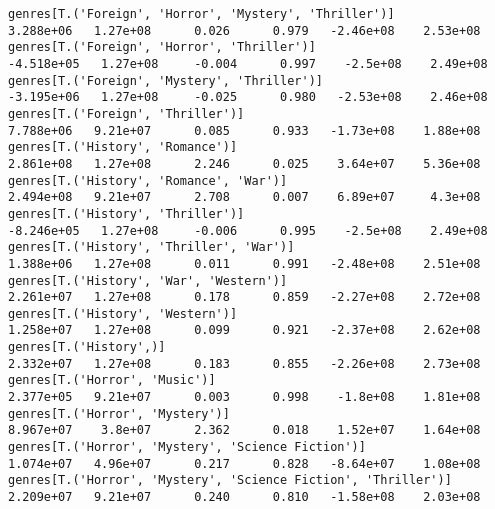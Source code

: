 \documentclass[11pt]{article}
\begin{document}
\begin{Verbatim}[commandchars=\\\{\}]
genres[T.('Foreign', 'Horror', 'Mystery', 'Thriller')]                                                        3.288e+06   1.27e+08      0.026      0.979   -2.46e+08    2.53e+08
genres[T.('Foreign', 'Horror', 'Thriller')]                                                                  -4.518e+05   1.27e+08     -0.004      0.997    -2.5e+08    2.49e+08
genres[T.('Foreign', 'Mystery', 'Thriller')]                                                                 -3.195e+06   1.27e+08     -0.025      0.980   -2.53e+08    2.46e+08
genres[T.('Foreign', 'Thriller')]                                                                             7.788e+06   9.21e+07      0.085      0.933   -1.73e+08    1.88e+08
genres[T.('History', 'Romance')]                                                                              2.861e+08   1.27e+08      2.246      0.025    3.64e+07    5.36e+08
genres[T.('History', 'Romance', 'War')]                                                                       2.494e+08   9.21e+07      2.708      0.007    6.89e+07     4.3e+08
genres[T.('History', 'Thriller')]                                                                            -8.246e+05   1.27e+08     -0.006      0.995    -2.5e+08    2.49e+08
genres[T.('History', 'Thriller', 'War')]                                                                      1.388e+06   1.27e+08      0.011      0.991   -2.48e+08    2.51e+08
genres[T.('History', 'War', 'Western')]                                                                       2.261e+07   1.27e+08      0.178      0.859   -2.27e+08    2.72e+08
genres[T.('History', 'Western')]                                                                              1.258e+07   1.27e+08      0.099      0.921   -2.37e+08    2.62e+08
genres[T.('History',)]                                                                                        2.332e+07   1.27e+08      0.183      0.855   -2.26e+08    2.73e+08
genres[T.('Horror', 'Music')]                                                                                 2.377e+05   9.21e+07      0.003      0.998    -1.8e+08    1.81e+08
genres[T.('Horror', 'Mystery')]                                                                               8.967e+07    3.8e+07      2.362      0.018    1.52e+07    1.64e+08
genres[T.('Horror', 'Mystery', 'Science Fiction')]                                                            1.074e+07   4.96e+07      0.217      0.828   -8.64e+07    1.08e+08
genres[T.('Horror', 'Mystery', 'Science Fiction', 'Thriller')]                                                2.209e+07   9.21e+07      0.240      0.810   -1.58e+08    2.03e+08

\end{Verbatim}
\end{document}
